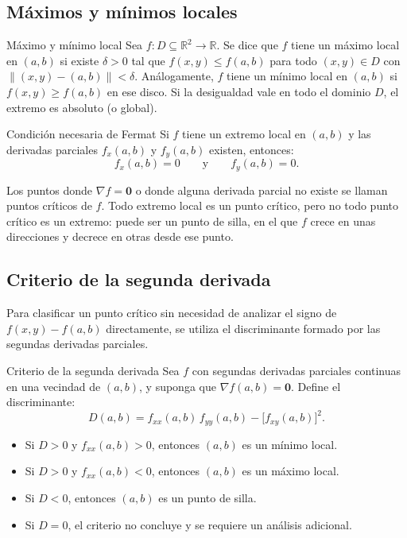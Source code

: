 \subsection{Máximos y mínimos locales}

\begin{mydefinition}{Máximo y mínimo local}
Sea $f: D \subseteq \mathbb{R}^2 \to \mathbb{R}$. Se dice que $f$ tiene un máximo local en $(a, b)$ si existe $\delta > 0$ tal que $f(x, y) \leq f(a, b)$ para todo $(x, y) \in D$ con $\|(x,y)-(a,b)\| < \delta$. Análogamente, $f$ tiene un mínimo local en $(a, b)$ si $f(x, y) \geq f(a, b)$ en ese disco. Si la desigualdad vale en todo el dominio $D$, el extremo es absoluto (o global).
\end{mydefinition}

\begin{mytheorem}{Condición necesaria de Fermat}
Si $f$ tiene un extremo local en $(a, b)$ y las derivadas parciales $f_x(a, b)$ y $f_y(a, b)$ existen, entonces:
\[
f_x(a, b) = 0 \qquad \text{y} \qquad f_y(a, b) = 0.
\]
\end{mytheorem}

Los puntos donde $\nabla f = \mathbf{0}$ o donde alguna derivada parcial no existe se llaman puntos críticos de $f$. Todo extremo local es un punto crítico, pero no todo punto crítico es un extremo: puede ser un punto de silla, en el que $f$ crece en unas direcciones y decrece en otras desde ese punto.

\subsection{Criterio de la segunda derivada}

Para clasificar un punto crítico sin necesidad de analizar el signo de $f(x,y)-f(a,b)$ directamente, se utiliza el discriminante formado por las segundas derivadas parciales.

\begin{mytheorem}{Criterio de la segunda derivada}
Sea $f$ con segundas derivadas parciales continuas en una vecindad de $(a, b)$, y suponga que $\nabla f(a, b) = \mathbf{0}$. Define el discriminante:
\[
D(a, b) = f_{xx}(a,b)\,f_{yy}(a,b) - \bigl[f_{xy}(a,b)\bigr]^2.
\]
\begin{itemize}
    \item Si $D > 0$ y $f_{xx}(a,b) > 0$, entonces $(a,b)$ es un mínimo local.
    \item Si $D > 0$ y $f_{xx}(a,b) < 0$, entonces $(a,b)$ es un máximo local.
    \item Si $D < 0$, entonces $(a,b)$ es un punto de silla.
    \item Si $D = 0$, el criterio no concluye y se requiere un análisis adicional.
\end{itemize}
\end{mytheorem}

